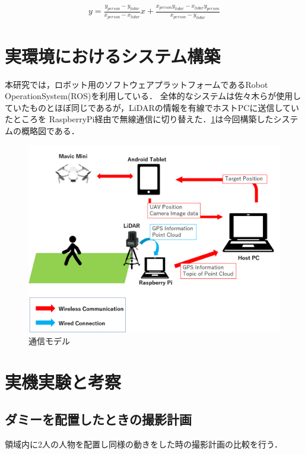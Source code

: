 \documentclass[autodetect-engine,dvipdfmx-if-dvi,ja=standard,a4j,jbase=10.5pt,twoside,twocolumn,magstyle=nomag*]{bxjsarticle}
\begin{document}
\begin{equation}
    \begin{aligned}
       y = \frac{y_{person} - y_{lidar}}{x_{person} - x_{lidar}} x + 
\frac{x_{person}y_{lidar} - x_{lidar}y_{person}}{x_{person} - y_{lidar}}
    \end{aligned}
    \label{eq:occlusion}
\end{equation}


\section{実環境におけるシステム構築}
本研究では，ロボット用のソフトウェアプラットフォームであるRobot OperationSystem(ROS)を利用している．
全体的なシステムは佐々木らが使用していたものとほぼ同じであるが，LiDARの情報を有線でホストPCに送信していたところを
RaspberryPi経由で無線通信に切り替えた．\cref{fig:system}は今回構築したシステムの概略図である．

\begin{figure}[h]
    \centering
    \includegraphics[width=0.7\linewidth, clip]{./figure/communication_model.png}
    \caption{通信モデル}
    \label{fig:system}
\end{figure}


\section{実機実験と考察}
\subsection{ダミーを配置したときの撮影計画}
領域内に2人の人物を配置し同様の動きをした時の撮影計画の比較を行う．
\end{document}
